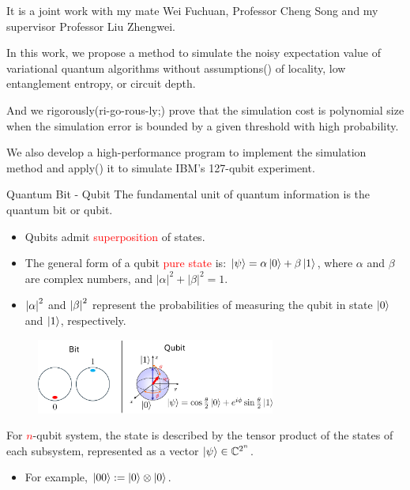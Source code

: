 \documentclass[10pt]{beamer}
\begin{document}
\begin{CJK}{UTF8}{gbsn}
{ It is a joint work with my mate Wei Fuchuan, Professor Cheng Song and my supervisor Professor Liu Zhengwei.

 In this work, we propose a method to simulate the noisy expectation value of variational quantum algorithms without assumptions() of locality, low entanglement entropy, or circuit depth.

 And we rigorously(ri-go-rous-ly;) prove that the simulation cost is polynomial size when the simulation error is bounded by a given threshold with high probability.

 We also develop a high-performance program to implement the simulation method and apply() it to simulate IBM's 127-qubit experiment.
}


\begin{frame}[fragile]{Quantum Bit - Qubit}
 The fundamental unit of quantum information is the quantum bit or qubit.
  \begin{itemize}
    \item Qubits admit \textcolor{red}{superposition} of states.
    \item The general form of a qubit \textcolor{red}{pure state} is: $\ket{\psi}=\alpha\ket{0}+\beta\ket{1}$, where $\alpha$ and $\beta$ are complex numbers, and $|\alpha|^2+|\beta|^2=1$.
    \item $\abs{\alpha}^2$ and $\abs{\beta}^2$ represent the probabilities of measuring the qubit in state $\ket{0}$ and $\ket{1}$, respectively.
  \end{itemize}
  \begin{figure}
    \centering
    \includegraphics[width=0.7\textwidth]{fig/qubit.pdf}
  \end{figure}
 For \textcolor{red}{$n$}-qubit system, the state is described by the tensor product of the states of each subsystem, represented as a vector $\ket{\psi}\in \mathbb{C}^{2^n}$.
  \begin{itemize}
    \item For example, $\ket{00}:=\ket{0}\otimes \ket{0}$.
  \end{itemize}
\end{frame}
\end{CJK}
\end{document}
